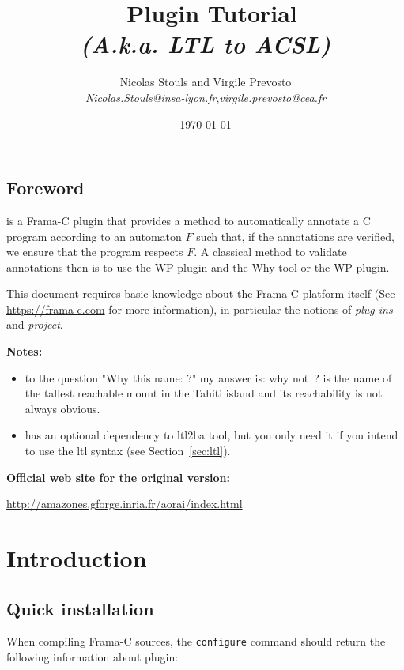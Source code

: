 \documentclass{report}
\title{\aorai\ Plugin Tutorial\\\textit{\normalsize (A.k.a. LTL to ACSL)}}
\author{Nicolas Stouls and Virgile Prevosto\\
\small\textit{Nicolas.Stouls@insa-lyon.fr},\textit{virgile.prevosto@cea.fr}}
\date{\today}
\begin{document}
\maketitle

\section*{Foreword}
\aorai is a Frama-C plugin that provides a method to automatically annotate a 
C program according to an automaton $F$ such that, if the annotations
are verified, we ensure that the program respects $F$. A classical method to
validate annotations then is to use the WP plugin and
the Why tool or the WP plugin.

This document requires basic knowledge about
the Frama-C platform itself (See \url{https://frama-c.com} for more information),
in particular the notions of {\it plug-ins} and {\it project}.

\vspace*{20pt}
\noindent \textbf{Notes:}
\begin{itemize}
  \item to the question "Why this name: \textit{\aorai} ?" 
    my answer is: why not~? \aorai is the name of the tallest reachable 
    mount in the Tahiti island and its reachability is not always obvious.
  \item \aorai has an optional dependency to ltl2ba tool, 
    but you only need it if you intend to use the ltl syntax
    (see Section~\ref{sec:ltl}).
\end{itemize}

\vspace*{20pt}
\noindent \textbf{Official web site for the original version:}

\begin{center}
  \url{http://amazones.gforge.inria.fr/aorai/index.html}
\end{center}

\tableofcontents

\chapter{Introduction}
\section{Quick installation}
\label{Quick installation}
    When compiling Frama-C sources, the \texttt{configure} command should
    return the following information about \aorai plugin:
\end{document}
